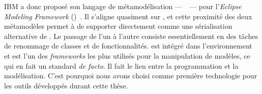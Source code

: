IBM a donc proposé son langage de métamodélisation ---~{\ecore}~--- pour
l'\emph{Eclipse Modeling Framework} ({\emf})~\cite{emf09}. Il s'aligne
quasiment sur {\emof}, et cette proximité des deux métamodèles permet à {\emf}
de supporter directement {\emof} comme une sérialisation {\xmi} alternative de
{\ecore}. Le passage de l'un à l'autre consiste essentiellement en des tâches
de renommage de classes et de fonctionnalités. {\ecore} est intégré dans
l'environnement {\eclipse} et est l'un des \emph{frameworks} les plus utilisés
pour la manipulation de modèles, ce qui en fait un standard \emph{de facto}. 
Il fait le lien entre la programmation {\java} et la modélisation. C'est
pourquoi nous avons choisi {\emf} comme première technologie pour les
outils développés durant cette thèse.





